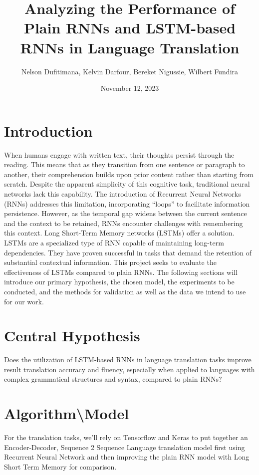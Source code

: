 \documentclass{article}
\title{Analyzing the Performance of Plain RNNs and LSTM-based RNNs in Language Translation}
\author{Nelson Dufitimana, Kelvin Darfour, Bereket Nigussie, Wilbert Fundira}
\date{November 12, 2023}
\begin{document}
\maketitle
\section{Introduction}


When humans engage with written text, their thoughts  persist through the reading. 
This means that as they transition from one sentence or paragraph to another, their
comprehension builds upon prior content rather than starting  from scratch. Despite
the apparent simplicity of this cognitive task, traditional neural networks lack 
this capability. The introduction of Recurrent Neural Networks (RNNs) addresses this 
limitation, incorporating ``loops'' to facilitate information persistence. However, 
as the temporal gap widens between the current sentence and the context to be retained,
RNNs encounter challenges with remembering this context. Long Short-Term Memory 
networks (LSTMs) offer a solution. LSTMs are a specialized type of RNN capable of 
maintaining long-term dependencies. They have proven successful in tasks that demand 
the retention of substantial contextual information. This project seeks to evaluate 
the effectiveness of LSTMs compared to plain RNNs. The following sections will 
introduce our primary hypothesis, the chosen model, the experiments to be conducted, 
and the methods for validation as well as the data we intend to use for our work.

\section{Central Hypothesis}


Does the utilization of LSTM-based RNNs in language translation tasks improve result 
translation accuracy and fluency, especially when applied to languages with complex 
grammatical structures and syntax, compared to plain RNNs? 

\section{Algorithm\textbackslash Model}


For the translation tasks, we’ll rely on Tensorflow and Keras to put together an 
Encoder-Decoder, Sequence 2 Sequence\cite{Keras} Language translation model first using 
Recurrent Neural Network and then improving the plain RNN model with Long Short Term 
Memory for comparison. 
\end{document}
